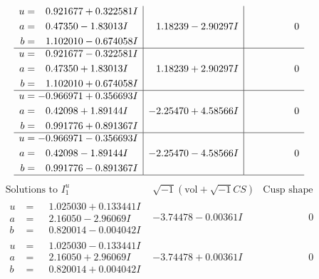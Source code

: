 \documentclass[1p]{elsarticle_modified}
\theoremstyle{definition}
\newcommand{\I}{\sqrt{-1}}
\begin{document}
$$\begin{array}{c|c|c}
\begin{aligned}
u &= \phantom{-}0.921677 + 0.322581 I \\
a &= \phantom{-}0.47350 - 1.83013 I \\
b &= \phantom{-}1.102010 - 0.674058 I\end{aligned}
 & \phantom{-}1.18239 - 2.90297 I & \phantom{-0.000000 } 0 \\ \hline\begin{aligned}
u &= \phantom{-}0.921677 - 0.322581 I \\
a &= \phantom{-}0.47350 + 1.83013 I \\
b &= \phantom{-}1.102010 + 0.674058 I\end{aligned}
 & \phantom{-}1.18239 + 2.90297 I & \phantom{-0.000000 } 0 \\ \hline\begin{aligned}
u &= -0.966971 + 0.356693 I \\
a &= \phantom{-}0.42098 + 1.89144 I \\
b &= \phantom{-}0.991776 + 0.891367 I\end{aligned}
 & -2.25470 + 4.58566 I & \phantom{-0.000000 } 0 \\ \hline\begin{aligned}
u &= -0.966971 - 0.356693 I \\
a &= \phantom{-}0.42098 - 1.89144 I \\
b &= \phantom{-}0.991776 - 0.891367 I\end{aligned}
 & -2.25470 - 4.58566 I & \phantom{-0.000000 } 0\\
 \hline 
 \end{array}$$\newpage$$\begin{array}{c|c|c}  
\text{Solutions to }I^u_{1}& \I (\text{vol} + \sqrt{-1}CS) & \text{Cusp shape}\\
 \hline 
\begin{aligned}
u &= \phantom{-}1.025030 + 0.133441 I \\
a &= \phantom{-}2.16050 - 2.96069 I \\
b &= \phantom{-}0.820014 - 0.004042 I\end{aligned}
 & -3.74478 - 0.00361 I & \phantom{-0.000000 } 0 \\ \hline\begin{aligned}
u &= \phantom{-}1.025030 - 0.133441 I \\
a &= \phantom{-}2.16050 + 2.96069 I \\
b &= \phantom{-}0.820014 + 0.004042 I\end{aligned}
 & -3.74478 + 0.00361 I & \phantom{-0.000000 } 0 \\ \hline\begin{aligned}

\end{aligned}
\end{array}$$
\end{document}
